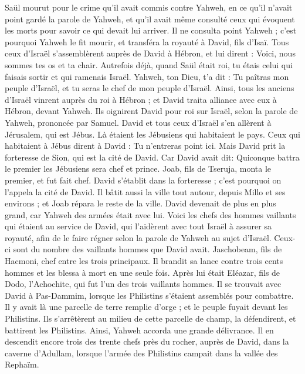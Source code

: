 \begin{multicols}{2}
Saül mourut pour le crime qu'il avait commis contre Yahweh, en ce qu'il n'avait point gardé la parole de Yahweh, et qu'il avait même consulté ceux qui évoquent les morts pour savoir ce qui devait lui arriver.
Il ne consulta point Yahweh ; c'est pourquoi Yahweh le fit mourir, et transféra la royauté à David, fils d'Isaï.
\VerseOne{}Tous ceux d'Israël s'assemblèrent auprès de David à Hébron, et lui dirent : Voici, nous sommes tes os et ta chair.
Autrefois déjà, quand Saül était roi, tu étais celui qui faisais sortir et qui ramenais Israël. Yahweh, ton Dieu, t'a dit : Tu paîtras mon peuple d'Israël, et tu seras le chef de mon peuple d'Israël.
Ainsi, tous les anciens d'Israël vinrent auprès du roi à Hébron ; et David traita alliance avec eux à Hébron, devant Yahweh. Ils oignirent David pour roi sur Israël, selon la parole de Yahweh, prononcée par Samuel.
David et tous ceux d'Israël s'en allèrent à Jérusalem, qui est Jébus. Là étaient  les Jébusiens qui habitaient le pays.
Ceux qui habitaient à Jébus dirent à David : Tu n'entreras point ici. Mais David prit la forteresse de Sion, qui est la cité de David.
Car David avait dit: Quiconque battra le premier les Jébusiens sera chef et prince. Joab, fils de Tseruja, monta le premier, et fut fait chef.
David s’établit dans la forteresse ; c'est pourquoi on l'appela la cité de David.
Il bâtit aussi la ville tout autour, depuis Millo et ses environs ; et Joab répara le reste de la ville.
David devenait de plus en plus grand, car Yahweh des armées était avec lui.
Voici les chefs des hommes vaillants qui étaient au service de David, qui l’aidèrent avec tout Israël à assurer sa royauté, afin de le faire régner selon la parole de Yahweh au sujet d’Israël.
Ceux-ci sont du nombre des vaillants hommes que David avait. Jaschobeam, fils de Hacmoni, chef entre les trois principaux. Il brandit sa lance contre trois cents hommes et les blessa à mort en une seule fois.
Après lui était Eléazar, fils de Dodo, l'Achochite, qui fut l’un des trois vaillants hommes.
Il se trouvait avec David à Pas-Dammim, lorsque les Philistins s'étaient assemblés pour combattre. Il y avait là une parcelle de terre remplie d'orge ; et le peuple fuyait devant les Philistins.
Ils s'arrêtèrent au milieu de cette parcelle de champ, la défendirent, et battirent les Philistins. Ainsi, Yahweh accorda une grande délivrance.
Il en descendit encore trois des trente chefs près du rocher, auprès de David, dans la caverne d'Adullam, lorsque l'armée des Philistins campait dans la vallée des Rephaïm.

\end{multicols}
